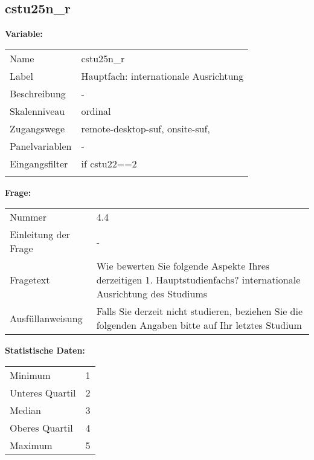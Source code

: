 	
	
	\subsection{cstu25n\_r}
	\label{subSection:cstu25n_r}

	\noindent\textbf{Variable:}\\
		\begin{tabular}{lL{11.3cm}}
			\label{tableVariable:cstu25n_r}
			Name & cstu25n\_r \\
			Label & Hauptfach: internationale Ausrichtung \\
			Beschreibung & - \\
			Skalenniveau & ordinal \\
			Zugangswege &
				remote-desktop-suf,
				onsite-suf,
 \\
			Panelvariablen & -
			 \\
			Eingangsfilter & if cstu22==2 \\
 \\
		\end{tabular}

		\vspace*{1 cm}
		\noindent\textbf{Frage:}\\
		\begin{tabular}{lL{11.3cm}}
			\label{tableQuestion:cstu25n_r}
			Nummer & 4.4 \\
			Einleitung der Frage & - \\
			Fragetext & Wie bewerten Sie folgende Aspekte Ihres derzeitigen 1. Hauptstudienfachs?
internationale Ausrichtung des Studiums \\
			Ausfüllanweisung & Falls Sie derzeit nicht studieren, beziehen Sie die folgenden Angaben bitte auf Ihr letztes Studium \\
		\end{tabular}


		\vspace*{1 cm}
		\noindent\textbf{Statistische Daten:}\\
			\begin{tabular}{ll}
				\label{tableStatistics:cstu25n_r}
					Minimum & 1 \\
					Unteres Quartil & 2 \\
					Median & 3 \\
					Oberes Quartil & 4 \\
					Maximum & 5 \\
			\end{tabular}



